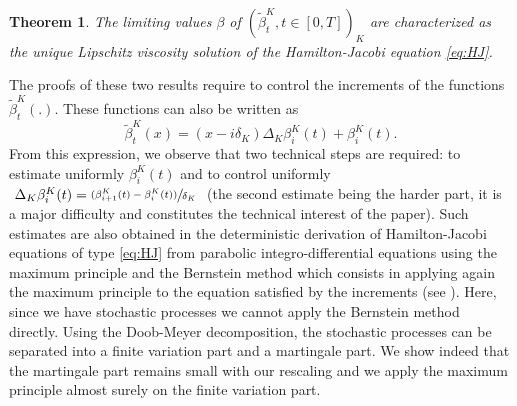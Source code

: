 \documentclass[JEP,XML,SOM,Unicode,published]{cedram}
\newcommand{\psfrac}[2]{\sfrac{(#1)}{#2}}
\theoremstyle{plain}
\newtheorem{theorem}{Theorem}[section]
\theoremstyle{remark}
\begin{document}
\begin{theorem}
\label{thm:identification}
The limiting values $\beta$ of $(\tilde \beta^K_{t}, t\in[0,T])_{K}$ are characterized as {the} unique Lipschitz viscosity solution of the Hamilton-Jacobi equation \eqref{eq:HJ}.
\end{theorem}

The proofs of these two results require to control the increments of the functions $\widetilde \beta^K_{t}(.)$.
These functions
can also be written as \[\widetilde
\beta^K_{t}(x)
=(x-i\delta_K)\Delta_K\beta^K_i(t)+\beta^K_i(t).\]
From this expression, we observe that two technical steps are required: to estimate uniformly $\beta_{i}^K(t)$ and to control uniformly $\ \Delta_K\beta^K_i(t)=\psfrac{\beta_{i+1}^K(t)-\beta_{i}^K(t)}{\delta_K}\ $ (the second estimate being the harder part, it is a major difficulty and constitutes the technical interest of the paper). Such estimates are also obtained in the deterministic derivation of Hamilton-Jacobi equations of type \eqref{eq:HJ} from parabolic integro-differential equations using the maximum principle and the Bernstein method which consists in applying again the maximum principle to the equation satisfied by the increments (see \cite{Barles2009}). Here, since we have stochastic processes we cannot apply the Bernstein method directly. Using the Doob-Meyer decomposition, the stochastic processes can be separated into a finite variation part and a martingale part. We show indeed that the martingale part remains small with our rescaling and we apply the maximum principle almost surely on the finite variation part.
\end{document}
